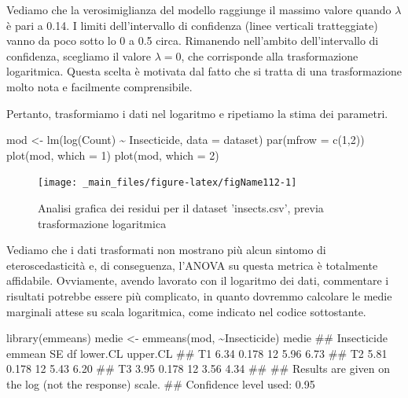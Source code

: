\documentclass[a4paper,12pt,oneside]{book}
\newenvironment{Shaded}{\begin{snugshade}}{\end{snugshade}}
\newcommand{\DecValTok}[1]{#1}
\newcommand{\SpecialCharTok}[1]{#1}
\newcommand{\DocumentationTok}[1]{#1}
\newcommand{\OtherTok}[1]{#1}
\newcommand{\FunctionTok}[1]{#1}
\newcommand{\AttributeTok}[1]{#1}
\newcommand{\NormalTok}[1]{#1}
\begin{document}
Vediamo che la verosimiglianza del modello raggiunge il massimo valore quando \(\lambda\) è pari a 0.14. I limiti dell'intervallo di confidenza (linee verticali tratteggiate) vanno da poco sotto lo 0 a 0.5 circa. Rimanendo nell'ambito dell'intervallo di confidenza, scegliamo il valore \(\lambda = 0\), che corrisponde alla trasformazione logaritmica. Questa scelta è motivata dal fatto che si tratta di una trasformazione molto nota e facilmente comprensibile.

Pertanto, trasformiamo i dati nel logaritmo e ripetiamo la stima dei parametri.

\begin{Shaded}
\begin{Highlighting}[]
\NormalTok{mod }\OtherTok{\textless{}{-}} \FunctionTok{lm}\NormalTok{(}\FunctionTok{log}\NormalTok{(Count) }\SpecialCharTok{\textasciitilde{}}\NormalTok{ Insecticide, }\AttributeTok{data =}\NormalTok{ dataset)}
\FunctionTok{par}\NormalTok{(}\AttributeTok{mfrow =} \FunctionTok{c}\NormalTok{(}\DecValTok{1}\NormalTok{,}\DecValTok{2}\NormalTok{))}
\FunctionTok{plot}\NormalTok{(mod, }\AttributeTok{which =} \DecValTok{1}\NormalTok{)}
\FunctionTok{plot}\NormalTok{(mod, }\AttributeTok{which =} \DecValTok{2}\NormalTok{)}
\end{Highlighting}
\end{Shaded}

\begin{figure}

{\centering \texttt{[image: \_main\_files/figure-latex/figName112-1]} 

}

\caption{Analisi grafica dei residui per il dataset 'insects.csv', previa trasformazione logaritmica}\label{fig:figName112}
\end{figure}

Vediamo che i dati trasformati non mostrano più alcun sintomo di eteroscedasticità e, di conseguenza, l'ANOVA su questa metrica è totalmente affidabile. Ovviamente, avendo lavorato con il logaritmo dei dati, commentare i risultati potrebbe essere più complicato, in quanto dovremmo calcolare le medie marginali attese su scala logaritmica, come indicato nel codice sottostante.

\begin{Shaded}
\begin{Highlighting}[]
\FunctionTok{library}\NormalTok{(emmeans)}
\NormalTok{medie }\OtherTok{\textless{}{-}} \FunctionTok{emmeans}\NormalTok{(mod, }\SpecialCharTok{\textasciitilde{}}\NormalTok{Insecticide)}
\NormalTok{medie}
\DocumentationTok{\#\#  Insecticide emmean    SE df lower.CL upper.CL}
\DocumentationTok{\#\#  T1            6.34 0.178 12     5.96     6.73}
\DocumentationTok{\#\#  T2            5.81 0.178 12     5.43     6.20}
\DocumentationTok{\#\#  T3            3.95 0.178 12     3.56     4.34}
\DocumentationTok{\#\# }
\DocumentationTok{\#\# Results are given on the log (not the response) scale. }
\DocumentationTok{\#\# Confidence level used: 0.95}
\end{Highlighting}
\end{Shaded}
\end{document}

